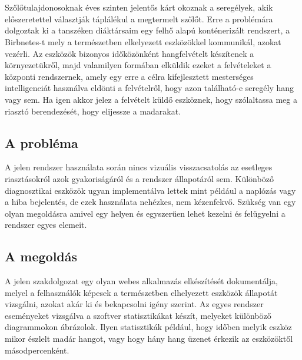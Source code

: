 \chapter{\bevezetes}
Szőlőtulajdonosoknak éves szinten jelentős kárt okoznak a seregélyek, akik előszeretettel választják táplálékul a megtermelt szőlőt.
Erre a problémára dolgoztak ki a tanszéken diáktársaim egy felhő alapú konténerizált rendszert, a Birbnetes-t
mely a természetben elkelyezett eszközökkel kommunikál, azokat vezérli.
Az eszközök bizonyos időközönként hangfelvételt készítenek a környezetükről,
majd valamilyen formában elküldik ezeket a felvételeket a központi rendszernek,
amely egy erre a célra kifejlesztett mesterséges intelligenciát használva eldönti
a felvételről, hogy azon található-e seregély hang vagy sem.
Ha igen akkor jelez a felvételt küldő eszköznek, hogy szólaltassa meg a riasztó
berendezését, hogy elijessze a madarakat.

\section{A probléma}
A jelen rendszer használata során nincs vizuális visszacsatolás az esetleges riasztásokról azok gyakoriságáról
és a rendszer állapotáról sem. Különböző diagnosztikai eszközök ugyan implementálva lettek mint például
a naplózás vagy a hiba bejelentés, de ezek használata nehézkes, nem kézenfekvő. 
Szükség van egy olyan megoldásra amivel egy helyen és egyszerűen lehet kezelni és felügyelni a rendszer egyes elemeit.

\section{A megoldás}
A jelen szakdolgozat egy olyan webes alkalmazás elkészítését dokumentálja, melyel a felhasználók képesek
a természetben elhelyezett eszközök állapotát vizsgálni, azokat akár ki és bekapcsolni igény szerint.
Az egyes rendszer eseményeket vizsgálva a szoftver statisztikákat készít, melyeket különböző diagrammokon ábrázolok.
Ilyen statisztikák például, hogy időben melyik eszköz mikor észlelt madár hangot, vagy hogy hány hang üzenet érkezik
az eszközöktől másodpercenként.

